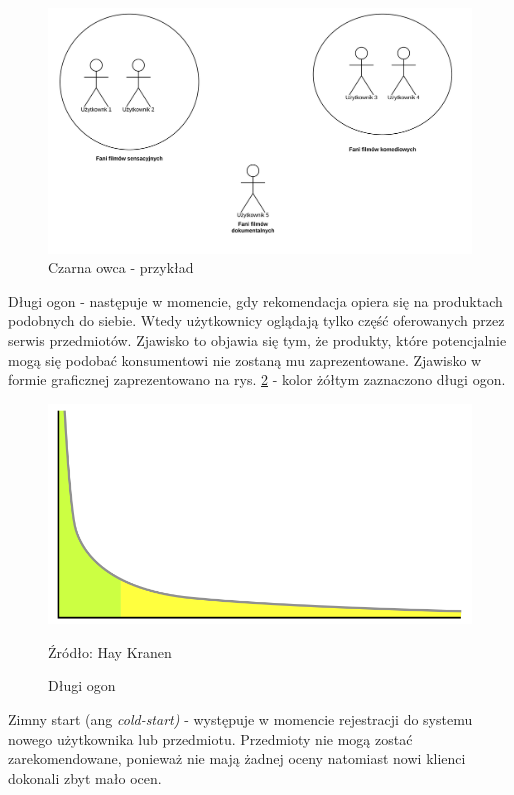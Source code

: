\begin{figure}[h]
    \centering
    \includegraphics[scale=0.5]{images/grey_sheep.png}
    \caption{Czarna owca - przykład}
    \label{fig:grey-sheep}
\end{figure}

Długi ogon - następuje w momencie, gdy rekomendacja opiera się na produktach podobnych do siebie. Wtedy użytkownicy oglądają tylko część oferowanych przez serwis przedmiotów. Zjawisko to objawia się tym, że produkty, które potencjalnie mogą się podobać konsumentowi nie zostaną mu zaprezentowane. Zjawisko w formie graficznej zaprezentowano na rys. \ref{fig:long-tail} - kolor żółtym zaznaczono długi ogon.

\begin{figure}[h]
    \centering
    \includegraphics[scale=0.4]{images/long_tail.png}
    \caption{Długi ogon}
    Źródło: Hay Kranen
    \label{fig:long-tail}
\end{figure}

Zimny start (ang \textit{cold-start)} - występuje w momencie rejestracji do systemu nowego użytkownika lub przedmiotu. Przedmioty nie mogą zostać zarekomendowane, ponieważ nie mają żadnej oceny natomiast nowi klienci dokonali zbyt mało ocen.

